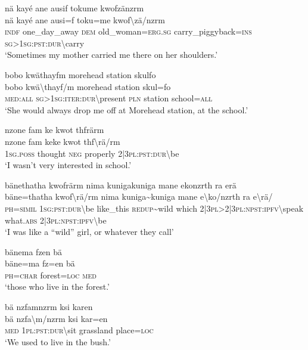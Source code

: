\ea\label{ex:14:a3099}
nä kayé ane ausif tokume kwofzänzrm\\
\gll nä	kayé	ane	ausi=f	toku=me	kwof{\textbackslash}zä/nzrm\\
     \textsc{indf}	one\_day\_away	\textsc{dem}	old\_woman=\textsc{erg}.\textsc{sg}	carry\_piggyback=\textsc{ins}	\textsc{sg}>1\textsc{sg}:\textsc{pst}:\textsc{dur}{\textbackslash}carry\\
\glt `Sometimes my mother carried me there on her shoulders.'
\z

\ea\label{ex:14:a3100}
bobo kwäthayfm morehead station skulfo\\
\gll bobo	kwä{\textbackslash}thayf/m	morehead	station	skul=fo\\
     \textsc{med}:\textsc{all}	\textsc{sg}>1\textsc{sg}:\textsc{iter}:\textsc{dur}{\textbackslash}present	\textsc{pln}	station	school=\textsc{all}\\
\glt `She would always drop me off at Morehead station, at the school.'
\z

\ea\label{ex:14:a3101}
nzone fam ke kwot thfrärm\\
\gll nzone	fam	keke	kwot	thf{\textbackslash}rä/rm\\
     1\textsc{sg}.\textsc{poss}	thought	\textsc{neg}	properly	2|3\textsc{pl}:\textsc{pst}:\textsc{dur}{\textbackslash}be\\
\glt `I wasn't very interested in school.'
\z

\ea\label{ex:14:a3102}
bänethatha kwofrärm nima kunigakuniga mane ekonzrth ra erä\\
\gll bäne=thatha	kwof{\textbackslash}rä/rm	nima	kuniga{\textasciitilde}kuniga	mane	e{\textbackslash}ko/nzrth	ra	e{\textbackslash}rä/\\
     \textsc{ph}=\textsc{simil}	1\textsc{sg}:\textsc{pst}:\textsc{dur}{\textbackslash}be	like\_this	\textsc{redup}{\textasciitilde}wild	which	2|3\textsc{pl}>2|3\textsc{pl}:\textsc{npst}:\textsc{ipfv}{\textbackslash}speak	what.\textsc{abs}	2|3\textsc{pl}:\textsc{npst}:\textsc{ipfv}{\textbackslash}be\\
\glt `I was like a ``wild'' girl, or whatever they call'
\z

\ea\label{ex:14:a3104}
bänema fzen bä\\
\gll bäne=ma	fz=en	bä\\
     \textsc{ph}=\textsc{char}	forest=\textsc{loc}	\textsc{med}\\
\glt `those who live in the forest.'
\z

\ea\label{ex:14:a11353}
bä nzfamnzrm ksi karen\\
\gll bä	nzfa{\textbackslash}m/nzrm	ksi	kar=en\\
     \textsc{med}	1\textsc{pl}:\textsc{pst}:\textsc{dur}{\textbackslash}sit	grassland	place=\textsc{loc}\\
\glt `We used to live in the bush.'
\z

